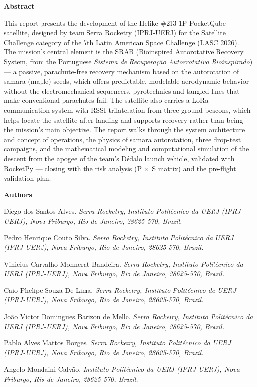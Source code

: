 \textbf{Abstract}

This report presents the development of the Helike \#213 1P PocketQube
satellite, designed by team Serra Rocketry (IPRJ-UERJ) for the
Satellite Challenge category of the 7th Latin American Space Challenge
(LASC 2026). The mission's central element is the SRAB (Bioinspired
Autorotative Recovery System, from the Portuguese \textit{Sistema de Recuperação
Autorrotativo Bioinspirado}) --- a passive, parachute-free recovery
mechanism based on the autorotation of samara (maple) seeds, which
offers predictable, modelable aerodynamic behavior without the
electromechanical sequencers, pyrotechnics and tangled lines that make
conventional parachutes fail. The satellite also carries a LoRa
communication system with RSSI trilateration from three ground
beacons, which helps locate the satellite after landing and supports
recovery rather than being the mission's main objective. The report
walks through the system architecture and concept of operations, the
physics of samara autorotation, three drop-test campaigns, and the
mathematical modeling and computational simulation of the descent from
the apogee of the team's Dédalo launch vehicle, validated with
RocketPy --- closing with the risk analysis (P $\times$ S matrix) and the pre-flight
validation plan.

\textbf{Authors}

Diego dos Santos Alves. \emph{Serra Rocketry, Instituto Politécnico da UERJ
(IPRJ-UERJ), Nova Friburgo, Rio de Janeiro, 28625-570, Brazil.}

Pedro Henrique Couto Silva. \emph{Serra Rocketry, Instituto Politécnico da
UERJ (IPRJ-UERJ), Nova Friburgo, Rio de Janeiro, 28625-570, Brazil.}

Vinicius Carvalho Monnerat Bandeira. \emph{Serra Rocketry, Instituto
Politécnico da UERJ (IPRJ-UERJ), Nova Friburgo, Rio de Janeiro, 28625-570,
Brazil.}

Caio Phelipe Souza De Lima. \emph{Serra Rocketry, Instituto Politécnico da
UERJ (IPRJ-UERJ), Nova Friburgo, Rio de Janeiro, 28625-570, Brazil.}

João Victor Domingues Barizon de Mello. \emph{Serra Rocketry, Instituto
Politécnico da UERJ (IPRJ-UERJ), Nova Friburgo, Rio de Janeiro, 28625-570,
Brazil.}

Pablo Alves Mattos Borges. \emph{Serra Rocketry, Instituto Politécnico da
UERJ (IPRJ-UERJ), Nova Friburgo, Rio de Janeiro, 28625-570, Brazil.}

Angelo Mondaini Calvão. \emph{Instituto Politécnico da UERJ (IPRJ-UERJ),
Nova Friburgo, Rio de Janeiro, 28625-570, Brazil.}

